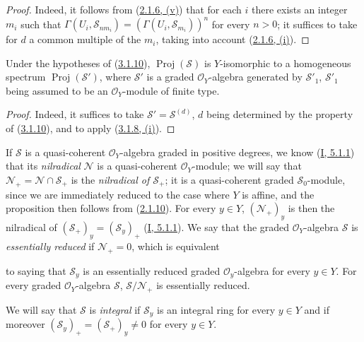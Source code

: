 \begin{proof}
Indeed, it follows from (\hyperref[II.2.1.6]{2.1.6, (v)}) that for each
$i$ there exists an integer $m_i$ such that
$\Gamma(U_i,\mathcal{S}_{nm_i})=(\Gamma(U_i,\mathcal{S}_{m_i}))^n$ for every
$n>0$; it suffices to take for $d$ a common multiple of the $m_i$, taking
into account (\hyperref[II.2.1.6]{2.1.6, (i)}).
\end{proof}

\begin{corollary}[3.1.11]
\label{II.3.1.11}
Under the hypotheses of (\hyperref[II.3.1.10]{3.1.10}),
$\operatorname{Proj}(\mathcal{S})$ is $Y$-isomorphic to a homogeneous spectrum
$\operatorname{Proj}(\mathcal{S}')$, where $\mathcal{S}'$ is a graded
$\mathcal{O}_Y$-algebra generated by $\mathcal{S}'_1$,
$\mathcal{S}'_1$ being assumed to be an $\mathcal{O}_Y$-module of finite type.
\end{corollary}

\begin{proof}
Indeed, it suffices to take $\mathcal{S}'=\mathcal{S}^{(d)}$, $d$ being
determined by the property of (\hyperref[II.3.1.10]{3.1.10}), and to
apply (\hyperref[II.3.1.8]{3.1.8, (i)}).
\end{proof}

\begin{env}[3.1.12]
\label{II.3.1.12}
If $\mathcal{S}$ is a quasi-coherent $\mathcal{O}_Y$-algebra graded in
positive degrees, we know (\hyperref[I.5.1.1]{I, 5.1.1}) that its
\emph{nilradical} $\mathcal{N}$ is a quasi-coherent $\mathcal{O}_Y$-module;
we will say that $\mathcal{N}_+=\mathcal{N}\cap\mathcal{S}_+$ is the
\emph{nilradical of $\mathcal{S}_+$}; it is a quasi-coherent graded
$\mathcal{S}_0$-module, since we are immediately reduced to the case where
$Y$ is affine, and the proposition then follows from
(\hyperref[II.2.1.10]{2.1.10}). For every $y\in Y$,
$(\mathcal{N}_+)_y$ is then the nilradical of
$(\mathcal{S}_+)_y=(\mathcal{S}_y)_+$
(\hyperref[I.5.1.1]{I, 5.1.1}). We say that the graded
$\mathcal{O}_Y$-algebra $\mathcal{S}$ is \emph{essentially reduced} if
$\mathcal{N}_+=0$, which is equivalent


to saying that $\mathcal{S}_y$ is an essentially reduced graded
$\mathcal{O}_y$-algebra for every $y\in Y$. For every graded
$\mathcal{O}_Y$-algebra $\mathcal{S}$, $\mathcal{S}/\mathcal{N}_+$ is
essentially reduced.

We will say that $\mathcal{S}$ is \emph{integral} if $\mathcal{S}_y$ is an
integral ring for every $y\in Y$ and if moreover
$(\mathcal{S}_y)_+=(\mathcal{S}_+)_y\neq0$ for every $y\in Y$.
\end{env}

